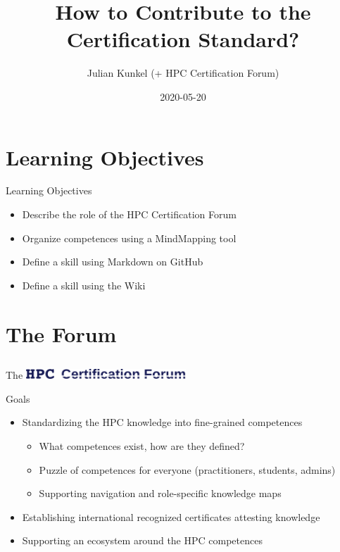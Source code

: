 \documentclass[compress,aspectratio=169]{beamer}
\subtitle{}
\title{\Large  How to Contribute to the Certification Standard?}
\author{Julian Kunkel (+ HPC Certification Forum)}
\date{2020-05-20}
\institute{Department of Computer Science}
\begin{document}
\begin{frame}[plain]{}
	\maketitle
\end{frame}

\section{Learning Objectives}

\begin{frame}{Learning Objectives}
\begin{itemize}
  \item Describe the role of the HPC Certification Forum
  \item Organize competences using a MindMapping tool
  \item Define a skill using Markdown on GitHub
  \item Define a skill using the Wiki
\end{itemize}
\end{frame}


\section{The Forum}
\subsection{}



\begin{frame}{The \includegraphics[width=0.45\textwidth]{hpccf-full}}
		\begin{block}{Goals}
			\begin{itemize}
				\item Standardizing the HPC knowledge into fine-grained competences
          \begin{itemize}
            \item What competences exist, how are they defined?
            \item Puzzle of competences for everyone (practitioners, students, admins)
            \item Supporting navigation and role-specific knowledge maps
          \end{itemize}
				\item Establishing international recognized certificates attesting knowledge
        \item Supporting an ecosystem around the HPC competences
			\end{itemize}
		\end{block}
\end{frame}
\end{document}
